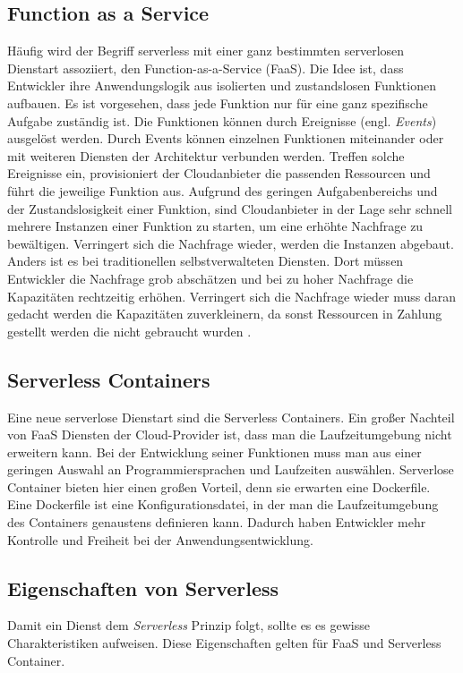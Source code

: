 \subsection{Function as a Service}
Häufig wird der Begriff serverless mit einer ganz bestimmten serverlosen Dienstart
assoziiert, den Function-as-a-Service (FaaS).
Die Idee ist, dass Entwickler ihre Anwendungslogik aus isolierten und 
zustandslosen Funktionen aufbauen. Es ist vorgesehen, dass jede Funktion nur für eine
ganz spezifische Aufgabe zuständig ist. Die Funktionen können
durch Ereignisse (engl. \textit{Events}) ausgelöst werden.
Durch Events können einzelnen Funktionen miteinander oder mit
weiteren Diensten der Architektur verbunden werden. 
Treffen solche Ereignisse ein, provisioniert der
Cloudanbieter die passenden Ressourcen und führt die jeweilige Funktion aus.
Aufgrund des geringen Aufgabenbereichs und der Zustandslosigkeit einer Funktion,
sind Cloudanbieter in der Lage sehr schnell mehrere Instanzen einer Funktion zu starten,
um eine erhöhte Nachfrage zu bewältigen.
Verringert sich die Nachfrage wieder, werden die Instanzen abgebaut. Anders ist 
es bei traditionellen selbstverwalteten Diensten. Dort müssen Entwickler die Nachfrage grob
abschätzen und bei zu hoher Nachfrage die Kapazitäten rechtzeitig
erhöhen. Verringert sich die Nachfrage wieder muss daran
gedacht werden die Kapazitäten zuverkleinern, da sonst
Ressourcen in Zahlung gestellt werden die nicht gebraucht wurden
\cite{WhatIsServerless} \cite{ServerlessTrends}.

\subsection{Serverless Containers}
Eine neue serverlose Dienstart sind die Serverless Containers.
Ein großer Nachteil von FaaS Diensten der Cloud-Provider ist,
dass man die Laufzeitumgebung nicht erweitern kann. Bei der
Entwicklung seiner Funktionen muss man aus einer geringen Auswahl
an Programmiersprachen und Laufzeiten auswählen. Serverlose Container
bieten hier einen großen Vorteil, denn sie erwarten eine Dockerfile.
Eine Dockerfile ist eine Konfigurationsdatei, in der man die
Laufzeitumgebung des Containers genaustens definieren kann.
Dadurch haben Entwickler mehr Kontrolle und Freiheit bei der
Anwendungsentwicklung. 

\subsection{Eigenschaften von Serverless}
Damit ein Dienst dem \textit{Serverless} Prinzip folgt, sollte es
es gewisse Charakteristiken aufweisen. Diese Eigenschaften gelten
für FaaS und Serverless Container.

